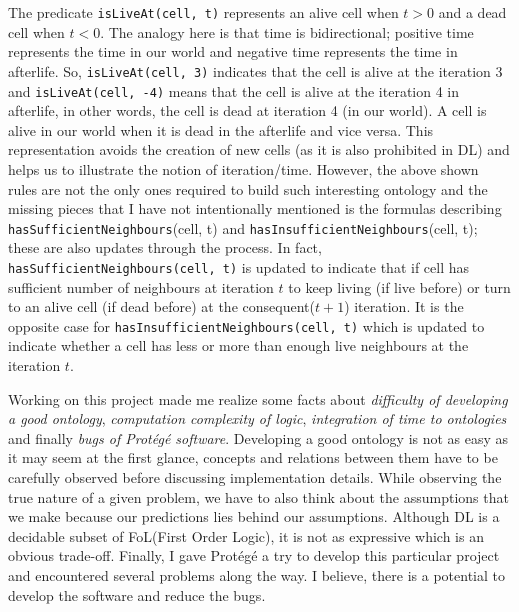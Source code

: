 \documentclass[a4paper]{article}
\begin{document}
The predicate \lstinline{isLiveAt(cell, t)} represents an alive cell when $t>0$ and a dead cell when $t<0$. The analogy here is that time is bidirectional; positive time represents the time in our world 
and negative time represents the time in afterlife. So, \lstinline{isLiveAt(cell, 3)} indicates that the cell is alive at the iteration 3 and \lstinline{isLiveAt(cell, -4)} means that the cell is alive 
at the iteration 4 in afterlife, in other words, the cell is dead at iteration 4 (in our world). A cell is alive in our world when it is dead in the afterlife and vice versa. This representation avoids 
the creation of new cells (as it is also prohibited in DL) and helps us to illustrate the notion of iteration/time. However, the above shown rules are not the only ones required to build such interesting 
ontology and the missing pieces that I have not intentionally mentioned is the formulas describing \lstinline{hasSufficientNeighbours}(cell, t) and \lstinline{hasInsufficientNeighbours}(cell, t); these 
are also updates through the process. In fact, \lstinline{hasSufficientNeighbours(cell, t)} is updated to indicate that if cell has sufficient number of neighbours at iteration $t$ to keep living 
(if live before) or turn to an alive cell (if dead before) at the consequent($t+1$) iteration. It is the opposite case for \lstinline{hasInsufficientNeighbours(cell, t)} which is updated to indicate 
whether a cell has less or more than enough live neighbours at the iteration $t$.

Working on this project made me realize some facts about \textit{difficulty of developing a good ontology}, \textit{computation complexity of logic}, \textit{integration of time to ontologies} and finally 
\textit{bugs of Prot\'eg\'e software}. Developing a good ontology is not as easy as it may seem at the first glance, concepts and relations between them have to be carefully observed before discussing 
implementation details. While observing the true nature of a given problem, we have to also think about the assumptions that we make because our predictions lies behind our assumptions. Although DL is 
a decidable subset of FoL(First Order Logic), it is not as expressive which is an obvious trade-off. Finally, I gave Prot\'eg\'e a try to develop this particular project and encountered several problems 
along the way. I believe, there is a potential to develop the software and reduce the bugs.

\newpage
\end{document}
